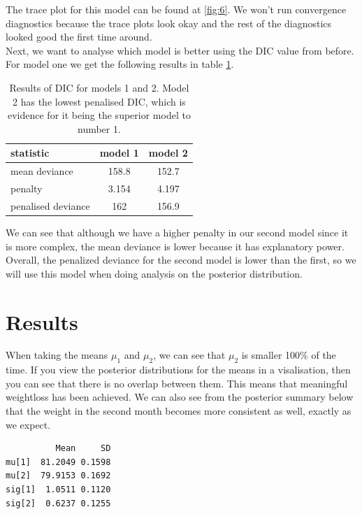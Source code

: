 \documentclass[journal, a4paper]{IEEEtran}
\begin{document}
The trace plot for this model can be found at \ref{fig:6}. We won't run convergence diagnostics because the trace plots look okay and the rest of the 
diagnostics looked good the first time around.\\

Next, we want to analyse which model is better using the DIC value from before. For model one we get the following results in table \ref{tab:1}.\\

\begin{table}[h!]
\centering
\begin{tabular}{|l|c|c|}
\hline
statistic          & \multicolumn{1}{l|}{model 1} & \multicolumn{1}{l|}{model 2} \\ \hline
mean deviance      & 158.8                        & 152.7                        \\
penalty            & 3.154                        & 4.197                        \\
penalised deviance & 162                          & 156.9                        \\ \hline
\end{tabular}
\caption{Results of DIC for models 1 and 2. Model 2 has the lowest penalised DIC, which is evidence for it being the superior model to number 1.}
\label{tab:1}
\end{table}

We can see that although we have a higher penalty in our second model since it is more complex, the mean deviance is lower because it has explanatory power.
Overall, the penalized deviance for the second model is lower than the first, so we will use this model when doing analysis on the posterior distribution.

\section{Results}

When taking the means $\mu_1$ and $\mu_2$, we can see that $\mu_2$ is smaller 100\% of the time. If you view the posterior distributions for the means in a
visalisation, then you can see that there is no overlap between them. This means that meaningful weightloss has been achieved. We can also see from the 
posterior summary below that the weight in the second month becomes more consistent as well, exactly as we expect.

\begin{verbatim}
          Mean     SD
mu[1]  81.2049 0.1598
mu[2]  79.9153 0.1692
sig[1]  1.0511 0.1120
sig[2]  0.6237 0.1255
\end{verbatim}
\end{document}

